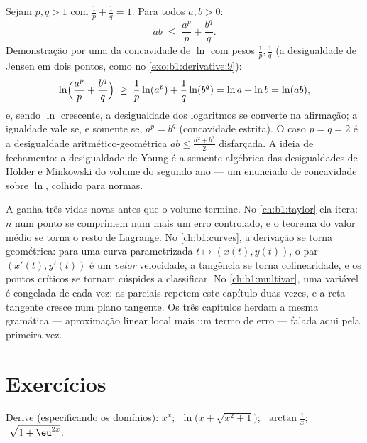 \begin{example}\label{ex:b1:derivative:young}
Sejam $p, q > 1$ com $\frac1p + \frac1q = 1$. Para todos $a, b > 0$:
\[
ab \;\leq\; \frac{a^p}{p} + \frac{b^q}{q} .
\]
Demonstração por uma  da concavidade de $\ln$ com pesos
$\frac1p, \frac1q$ (a desigualdade de Jensen em dois pontos, como no
\cref{exo:b1:derivative:9}):
\[
\ln\Bigl(\frac{a^p}{p} + \frac{b^q}{q}\Bigr)
\;\geq\; \frac1p \ln(a^p) + \frac1q \ln(b^q)
= \ln a + \ln b = \ln(ab),
\]
e, sendo $\ln$ crescente, a desigualdade dos logaritmos se converte na
afirmação; a igualdade vale se, e somente se, $a^p = b^q$ (concavidade
estrita). O caso $p = q = 2$ é a desigualdade aritmético-geométrica
$ab \leq
\frac{a^2 + b^2}{2}$ disfarçada. A ideia de fechamento: a desigualdade
de Young é a semente algébrica das desigualdades de Hölder e Minkowski
do volume do segundo ano --- um enunciado de concavidade
sobre $\ln$, colhido para normas.
\end{example}

\begin{remark}
A  ganha três vidas novas antes que o volume termine.
No \cref{ch:b1:taylor} ela itera: $n$  num ponto
se comprimem num  mais um erro controlado, e o
teorema do valor médio se torna o resto de Lagrange. No
\cref{ch:b1:curves}, a derivação se torna geométrica: para uma
curva parametrizada $t \mapsto (x(t), y(t))$, o par $(x'(t),
y'(t))$ é um \emph{vetor} velocidade, a tangência se torna
colinearidade, e os pontos críticos se tornam cúspides a classificar. No
\cref{ch:b1:multivar}, uma variável é congelada de cada vez: as 
parciais repetem este capítulo duas vezes, e a reta tangente
cresce num plano tangente. Os três capítulos herdam a mesma
gramática --- aproximação linear local mais um termo de erro ---
falada aqui pela primeira vez.
\end{remark}

\section{Exercícios}

\begin{exercise}[$\star$]\label{exo:b1:derivative:1}
Derive (especificando os domínios): $x^x$;
$\;\ln\bigl(x + \sqrt{x^2+1}\bigr)$; $\;\arctan\frac{1}{x}$;
$\;\sqrt{1 + \eu^{2x}}$.
\end{exercise}

